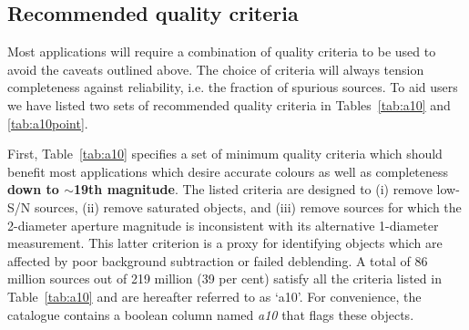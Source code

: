\documentclass[a4paper,useAMS,usenatbib]{mn2e}
\begin{document}
{\subsection{Recommended quality criteria}
\label{sec:qualitycriteria}

Most applications will require
a combination of quality criteria
to be used
to avoid the caveats outlined above.
The choice of criteria will always tension 
completeness against reliability,
i.e. the fraction of spurious sources.
To aid users we have listed two sets of
recommended quality criteria 
in Tables~\ref{tab:a10} and \ref{tab:a10point}.

First, Table~\ref{tab:a10} specifies
a set of minimum quality criteria
which should benefit most applications
which desire accurate colours
as well as completeness {\bf down to $\sim$19th magnitude}.
The listed criteria are designed to 
(i) remove low-S/N sources, 
(ii) remove saturated objects,
and (iii) remove sources for which the 2-diameter
aperture magnitude is inconsistent 
with its alternative 1-diameter measurement.
This latter criterion is a proxy
for identifying objects which are affected
by poor background subtraction
or failed deblending.
A total of 86 million sources out of 219 million 
(39 per cent) satisfy all the criteria listed in Table~\ref{tab:a10}
and are hereafter referred to as `a10'.
For convenience, the catalogue contains a boolean column
named \emph{a10} that flags these objects.

}
\end{document}
